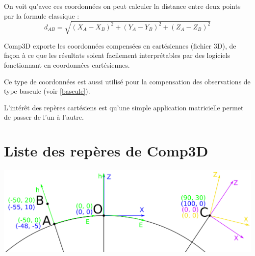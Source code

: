 \documentclass[french]{report}
\begin{document}
On voit qu'avec ces coordonnées on peut calculer la distance entre deux points par la formule classique :
$$d_{AB} = \sqrt{(X_A-X_B)^2+(Y_A-Y_B)^2+(Z_A-Z_B)^2}$$

Comp3D exporte les coordonnées compensées en cartésiennes (fichier 3D), de façon à ce que les résultats soient facilement
interprétables par des logiciels fonctionnant en coordonnées cartésiennes.

Ce type de coordonnées est aussi utilisé pour la compensation des observations de type bascule (voir \ref{bascule}).

L'intérêt des repères cartésiens est qu'une simple application matricielle permet de passer de l'un à l'autre.


\newpage

\section{Liste des repères de Comp3D}

\begin{center}
\includegraphics[width = 14cm]{images/frames}
\end{center}
\end{document}
